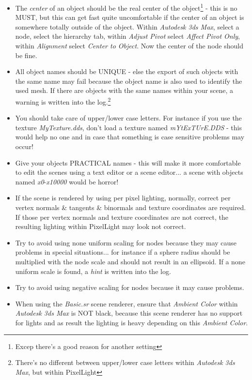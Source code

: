 \begin{itemize}
\item{The \emph{center} of an object should be the real center of the object\footnote{Excep there's a good reason for another setting} - this is no MUST, but this can get fast quite uncomfortable if the center of an object is somewhere totally outside of the object. Within \emph{Autodesk 3ds Max}, select a node, select the hierarchy tab, within \emph{Adjust Pivot} select \emph{Affect Pivot Only}, within \emph{Alignment} select \emph{Center to Object}. Now the center of the node should be fine.}
\item{All object names should be UNIQUE - else the export of such objects with the same name may fail because the object name is also used to identify the used mesh. If there are objects with the same names within your scene, a warning is written into the log.\footnote{There's no different between upper/lower case letters within \emph{Autodesk 3ds Max}, but within PixelLight}}
\item{You should take care of upper/lower case letters. For instance if you use the texture \emph{MyTexture.dds}, don't load a texture named \emph{mYtExTUrE.DDS} - this would help no one and in case that something is case sensitive problems may occur!}
\item{Give your objects PRACTICAL names - this will make it more comfortable to edit the scenes using a text editor or a scene editor... a scene with objects named \emph{x0}-\emph{x10000} would be horror!}
\item{If the scene is rendered by using per pixel lighting, normally, correct per vertex normals \& tangents \& binormals and texture coordinates are required. If those per vertex normals and texture coordinates are not correct, the resulting lighting within PixelLight may look not correct.}
\item{Try to avoid using none uniform scaling for nodes because they may cause problems in special situations... for instance if a sphere radius should be multiplied with the node scale and should not result in an ellipsoid. If a none uniform scale is found, a \emph{hint} is written into the log.}
\item{Try to avoid using negative scaling for nodes because it may cause problems.}
\item{When using the \emph{Basic.sr} scene renderer, ensure that \emph{Ambient Color} within \emph{Autodesk 3ds Max} is NOT black, because this scene renderer has no support for lights and as result the lighting is heavy depending on this \emph{Ambient Color}.}
\end{itemize}
